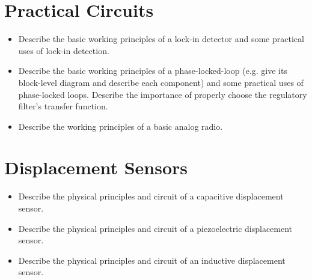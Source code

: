 \section{Practical Circuits}
\begin{itemize}

    \item Describe the basic working principles of a lock-in detector and some practical uses of lock-in detection.

    \item Describe the basic working principles of a phase-locked-loop (e.g. give its block-level diagram and describe each component) and some practical uses of phase-locked loops.
    Describe the importance of properly choose the regulatory filter's transfer function.

    \item Describe the working principles of a basic analog radio.

\end{itemize}

\section{Displacement Sensors}
\begin{itemize}

    \item Describe the physical principles and circuit of a capacitive displacement sensor.

    \item Describe the physical principles and circuit of a piezoelectric displacement sensor.

    \item Describe the physical principles and circuit of an inductive displacement sensor.

\end{itemize}



